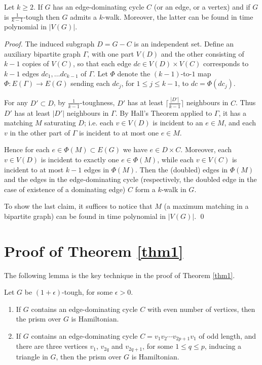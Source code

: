 \documentclass[runningheads,a4paper]{llncs}
\begin{document}
\begin{lemma}\label{addtec}
Let $k\geq 2$.
If $G$ has an edge-dominating cycle $C$ (or an edge, or a vertex) 
and if $G$ is $\frac{1}{k-1}$-tough then $G$ admits a $k$-walk.
Moreover, the latter can be found in time polynomial in $|V(G)|$.
\end{lemma}
\begin{proof} 
The induced subgraph $D=G-C$ is an independent set. Define an auxiliary bipartite 
graph $\Gamma$, with one part $V(D)$ and the other consisting of $k-1$ copies of $V(C)$, 
so that each edge $dc\in V(D)\times V(C)$ corresponds to $k-1$ edges
$dc_1,\dots dc_{k-1}$ of $\Gamma$. Let $\Phi$ denote the $(k-1)$-to-$1$ map
$\Phi: E(\Gamma)\to E(G)$ sending each $dc_j$, for $1\leq j\leq k-1$, to $dc=\Phi(dc_j)$.

For any $D'\subset D$, by $\frac{1}{k-1}$-toughness, $D'$ has at least
$\lceil\frac{|D'|}{k-1}\rceil$ neighbours in $C$. Thus $D'$ has at
least $|D'|$ neighbours in $\Gamma$.  By Hall's Theorem \cite[Theorem 16.4]{bomu08} applied
to $\Gamma$, it has a matching $M$ saturating $D$; i.e.  each $v\in V(D)$ is
incident to an $e\in M$, and each $v$ in the other part of $\Gamma$ is
incident to at most one $e\in M$.

Hence for each $e\in\Phi(M)\subset E(G)$ we have $e\in D\times C$. 
Moreover, each $v\in V(D)$ is incident to
exactly one $e\in \Phi(M)$, while each $v\in V(C)$ is incident to at most
$k-1$ edges in $\Phi(M)$. Then the (doubled) edges in $\Phi(M)$ and the edges
in the edge-dominating cycle (respectively, the doubled edge in the case of existence of a dominating edge) $C$ form a
$k$-walk in $G$.

To show the last claim, it suffices to notice that $M$ (a maximum matching
in a bipartite graph) can be found in time polynomial
in $|V(G)|$. \qed
\end{proof}

\section{Proof of Theorem \ref{thm1}}
The following lemma is the key technique in the proof of Theorem \ref{thm1}.
\begin{lemma}\label{keylem}
Let $G$ be $(1+\epsilon)$-tough, for some $\epsilon>0$.
\begin{enumerate}
\item If $G$ contains an edge-dominating cycle $C$ with even number of vertices, then the prism over $G$ is Hamiltonian.
\item If $G$ contains an edge-dominating cycle $C=v_1v_2\cdots v_{2p+1}v_1$ of odd length, and there are three vertices $v_1$, $v_{2q}$ and $v_{2q+1}$, for some $1\le q\le p$, inducing a triangle in $G$, then the prism over $G$ is Hamiltonian.
\end{enumerate}
\end{lemma}
\end{document}
